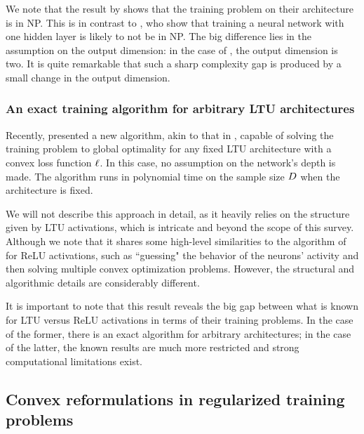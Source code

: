 We note that the result by \cite{arora2018understanding} shows that the training problem on their architecture is in NP. This is in contrast to  \cite{bertschinger2022training}, who show that training a neural network with one hidden layer is likely to not be in NP. The big difference lies in the assumption on the output dimension: in the case of \cite{bertschinger2022training}, the output dimension is two. It is quite remarkable that such a sharp complexity gap is produced by a small change in the output dimension.

\subsubsection{An exact training algorithm for arbitrary LTU architectures}

Recently, \cite{khalife2022neural} presented a new algorithm, akin to that in \cite{arora2018understanding}, capable of solving the training problem to global optimality for any fixed LTU architecture with a convex loss function $\ell$. In this case, no assumption on the network's depth is made. The algorithm runs in polynomial time on the sample size $D$ when the architecture is fixed.

We will not describe this approach in detail, as it heavily relies on the structure given by LTU activations, which is intricate and beyond the scope of this survey.
%
Although we note that it shares some high-level similarities to the algorithm of \cite{arora2018understanding} for ReLU activations, such as ``guessing" the behavior of the neurons' activity and then solving multiple convex optimization problems. However, the structural and algorithmic details are considerably different.

It is important to note that this result reveals the big gap between what is known for LTU versus ReLU activations in terms of their training problems. In the case of the former, there is an exact algorithm for arbitrary architectures; in the case of the latter, the known results are much more restricted and strong computational limitations exist.

\subsection{Convex reformulations in regularized training problems}

